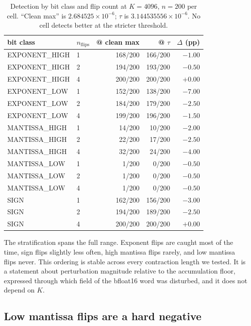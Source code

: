 \documentclass[11pt]{article}
\begin{document}
\begin{table}[t]
\centering
\begin{tabular}{llrrr}
\toprule
bit class & $n_{\text{flips}}$ & @ clean max & @ $\tau$ & $\Delta$ (pp) \\
\midrule
EXPONENT\_HIGH & 1 & 168/200 & 166/200 & $-1.00$ \\
EXPONENT\_HIGH & 2 & 194/200 & 193/200 & $-0.50$ \\
EXPONENT\_HIGH & 4 & 200/200 & 200/200 & $+0.00$ \\
EXPONENT\_LOW  & 1 & 152/200 & 138/200 & $-7.00$ \\
EXPONENT\_LOW  & 2 & 184/200 & 179/200 & $-2.50$ \\
EXPONENT\_LOW  & 4 & 199/200 & 196/200 & $-1.50$ \\
MANTISSA\_HIGH & 1 & 14/200  & 10/200  & $-2.00$ \\
MANTISSA\_HIGH & 2 & 22/200  & 17/200  & $-2.50$ \\
MANTISSA\_HIGH & 4 & 32/200  & 24/200  & $-4.00$ \\
MANTISSA\_LOW  & 1 & 1/200   & 0/200   & $-0.50$ \\
MANTISSA\_LOW  & 2 & 1/200   & 0/200   & $-0.50$ \\
MANTISSA\_LOW  & 4 & 1/200   & 0/200   & $-0.50$ \\
SIGN           & 1 & 162/200 & 156/200 & $-3.00$ \\
SIGN           & 2 & 194/200 & 189/200 & $-2.50$ \\
SIGN           & 4 & 200/200 & 200/200 & $+0.00$ \\
\bottomrule
\end{tabular}
\caption{Detection by bit class and flip count at $K = 4096$, $n = 200$ per
cell. ``Clean max'' is $2.684525 \times 10^{-6}$; $\tau$ is
$3.144535556 \times 10^{-6}$. No cell detects better at the stricter
threshold.}
\label{tab:matrix}
\end{table}

The stratification spans the full range. Exponent flips are caught most of the
time, sign flips slightly less often, high mantissa flips rarely, and low
mantissa flips never. This ordering is stable across every contraction length
we tested. It is a statement about perturbation magnitude relative to the
accumulation floor, expressed through which field of the bfloat16 word was
disturbed, and it does not depend on $K$.

\subsection{Low mantissa flips are a hard negative}
\label{sec:results:mantissa}
\end{document}
